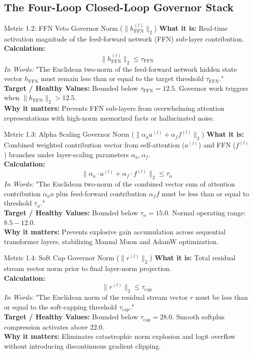 \documentclass[10pt,a4paper]{article}
\begin{document}
\subsection{The Four-Loop Closed-Loop Governor Stack}
\begin{metricbox}{Metric 1.2: FFN Veto Governor Norm ($\|h_{\text{FFN}}^{(l)}\|_2$)}
\textbf{What it is:} Real-time activation magnitude of the feed-forward network (FFN) sub-layer contribution.\\
\textbf{Calculation:}
$$\|h_{\text{FFN}}^{(l)}\|_2 \le \tau_{\text{FFN}}$$
\emph{In Words:} "The Euclidean two-norm of the feed-forward network hidden state vector $h_{\text{FFN}}$ must remain less than or equal to the target threshold $\tau_{\text{FFN}}$."\\
\textbf{Target / Healthy Values:} Bounded below $\tau_{\text{FFN}} = 12.5$. Governor work triggers when $\|h_{\text{FFN}}\|_2 > 12.5$.\\
\textbf{Why it matters:} Prevents FFN sub-layers from overwhelming attention representations with high-norm memorized facts or hallucinated noise.
\end{metricbox}

\begin{metricbox}{Metric 1.3: Alpha Scaling Governor Norm ($\|\alpha_a a^{(l)} + \alpha_f f^{(l)}\|_2$)}
\textbf{What it is:} Combined weighted contribution vector from self-attention ($a^{(l)}$) and FFN ($f^{(l)}$) branches under layer-scaling parameters $\alpha_a, \alpha_f$.\\
\textbf{Calculation:}
$$\|\alpha_a \cdot a^{(l)} + \alpha_f \cdot f^{(l)}\|_2 \le \tau_\alpha$$
\emph{In Words:} "The Euclidean two-norm of the combined vector sum of attention contribution $\alpha_a a$ plus feed-forward contribution $\alpha_f f$ must be less than or equal to threshold $\tau_\alpha$."\\
\textbf{Target / Healthy Values:} Bounded below $\tau_\alpha = 15.0$. Normal operating range: $8.5 - 12.0$.\\
\textbf{Why it matters:} Prevents explosive gain accumulation across sequential transformer layers, stabilizing Manual Muon and AdamW optimization.
\end{metricbox}

\begin{metricbox}{Metric 1.4: Soft Cap Governor Norm ($\|r^{(l)}\|_2$)}
\textbf{What it is:} Total residual stream vector norm prior to final layer-norm projection.\\
\textbf{Calculation:}
$$\|r^{(l)}\|_2 \le \tau_{\text{cap}}$$
\emph{In Words:} "The Euclidean norm of the residual stream vector $r$ must be less than or equal to the soft-capping threshold $\tau_{\text{cap}}$."\\
\textbf{Target / Healthy Values:} Bounded below $\tau_{\text{cap}} = 28.0$. Smooth softplus compression activates above $22.0$.\\
\textbf{Why it matters:} Eliminates catastrophic norm explosion and logit overflow without introducing discontinuous gradient clipping.
\end{metricbox}
\end{document}
